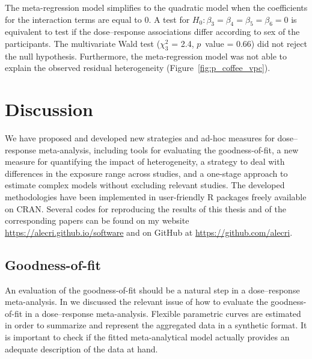 \documentclass[11pt,a4paper,twoside,openany]{book}\usepackage{knitr}
\begin{document}
{{\noindent The meta-regression model simplifies to the quadratic model when the coefficients for the interaction terms are equal to 0. A test for $H_0: \beta_3 = \beta_4 = \beta_5 = \beta_6 = 0$ is equivalent to test if the dose--response associations differ according to sex of the participants.  The multivariate Wald test ($\chi_3^2$ = 2.4, $p$~value = 0.66) did not reject the null hypothesis. Furthermore, the meta-regression model was not able to explain the observed residual heterogeneity (Figure~\ref{fig:p_coffee_vpc}).


%

\chapter{Discussion}

We have proposed and developed new strategies and ad-hoc measures for dose--response meta-analysis, including tools for evaluating the goodness-of-fit, a new measure for quantifying the impact of heterogeneity, a strategy to deal with differences in the exposure range across studies, and a one-stage approach to estimate complex models without excluding relevant studies.
The developed methodologies have been implemented in user-friendly \textsf{R} packages freely available on CRAN. Several codes for reproducing the results of this thesis and of the corresponding papers can be found on my website \url{ https://alecri.github.io/software} and on GitHub at \url{ https://github.com/alecri}.


\section{Goodness-of-fit}

An evaluation of the goodness-of-fit should be a natural step in a dose--response meta-analysis. In  we discussed the relevant issue of how to evaluate the goodness-of-fit in a dose--response meta-analysis. Flexible parametric curves are estimated in order to summarize and represent the aggregated data in a synthetic format. It is important to check if the fitted meta-analytical model actually provides an adequate description of the data at hand. 

}}
\end{document}

